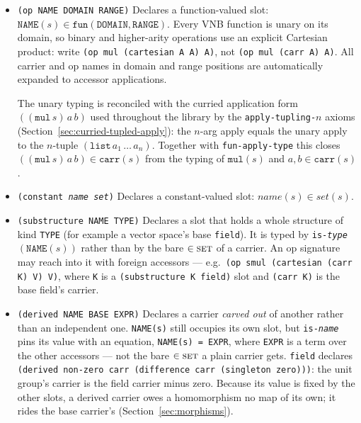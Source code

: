 \begin{itemize}
\item \texttt{(op NAME DOMAIN RANGE)}
  Declares a function-valued slot: $\mathtt{NAME}(s) \in
  \mathtt{fun}(\mathtt{DOMAIN}, \mathtt{RANGE})$.  Every VNB function is
  unary on its domain, so binary and higher-arity operations use an explicit
  Cartesian product: write \texttt{(op mul (cartesian A A) A)}, not
  \texttt{(op mul (carr A) A)}.  All carrier and op names in domain and range
  positions are automatically expanded to accessor applications.

  The unary typing is reconciled with the curried application form
  $((\mathtt{mul}\,s)\,a\,b)$ used throughout the library by the
  \texttt{apply-tupling-$n$} axioms
  (Section~\ref{sec:curried-tupled-apply}): the $n$-arg apply equals the
  unary apply to the $n$-tuple $(\texttt{list}\,a_1\,\ldots\,a_n)$.
  Together with \texttt{fun-apply-type} this closes
  $((\mathtt{mul}\,s)\,a\,b) \in \mathtt{carr}(s)$ from the typing of $\mathtt{mul}(s)$
  and $a,b \in \mathtt{carr}(s)$.

\item \texttt{(constant \textit{name} \textit{set})}
  Declares a constant-valued slot: $\textit{name}(s) \in \textit{set}(s)$.

\item \texttt{(substructure NAME TYPE)}
  Declares a slot that holds a whole structure of kind \texttt{TYPE}
  (for example a vector space's base \texttt{field}).  It is typed by
  \texttt{is-\textit{type}}$(\mathtt{NAME}(s))$ rather than by the bare
  $\in \textsc{set}$ of a carrier.  An op signature may reach into it
  with foreign accessors --- e.g.\
  \texttt{(op smul (cartesian (carr K) V) V)}, where \texttt{K} is a
  \texttt{(substructure K field)} slot and \texttt{(carr K)} is the base
  field's carrier.

\item \texttt{(derived NAME BASE EXPR)}
  Declares a carrier \emph{carved out} of another rather than an independent
  one.  \texttt{NAME(s)} still occupies its own slot, but \texttt{is-\textit{name}}
  pins its value with an equation, \texttt{NAME(s) = EXPR}, where \texttt{EXPR}
  is a term over the other accessors --- not the bare $\in\textsc{set}$ a plain
  carrier gets.  \texttt{field} declares
  \texttt{(derived non-zero carr (difference carr (singleton zero)))}: the unit
  group's carrier is the field carrier minus zero.  Because its value is fixed
  by the other slots, a derived carrier owes a homomorphism no map of its own;
  it rides the base carrier's (Section~\ref{sec:morphisms}).


\end{itemize}
